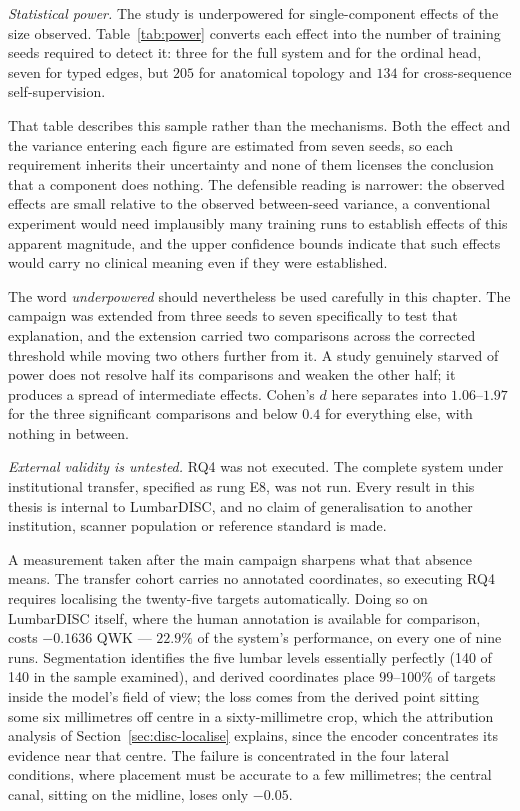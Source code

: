 \documentclass[12pt,a4paper]{report}
\begin{document}
\emph{Statistical power.} The study is underpowered for single-component effects
of the size observed. Table~\ref{tab:power} converts each effect into the number
of training seeds required to detect it: three for the full system and for the
ordinal head, seven for typed edges, but $205$ for anatomical topology and $134$
for cross-sequence self-supervision.

That table describes this sample rather than the mechanisms. Both the effect and
the variance entering each figure are estimated from seven seeds, so each
requirement inherits their uncertainty and none of them licenses the conclusion
that a component does nothing. The defensible reading is narrower: the observed
effects are small relative to the observed between-seed variance, a conventional
experiment would need implausibly many training runs to establish effects of this
apparent magnitude, and the upper confidence bounds indicate that such effects
would carry no clinical meaning even if they were established.

The word \emph{underpowered} should nevertheless be used carefully in this
chapter. The campaign was extended from three seeds to seven specifically to
test that explanation, and the extension carried two comparisons across the
corrected threshold while moving two others further from it. A study genuinely
starved of power does not resolve half its comparisons and weaken the other
half; it produces a spread of intermediate effects. Cohen's $d$ here separates
into $1.06$--$1.97$ for the three significant comparisons and below $0.4$ for
everything else, with nothing in between.

\emph{External validity is untested.} RQ4 was not executed. The complete system
under institutional transfer, specified as rung E8, was not run. Every result in
this thesis is internal to LumbarDISC, and no claim of generalisation to another
institution, scanner population or reference standard is made.

A measurement taken after the main campaign sharpens what that absence means.
The transfer cohort carries no annotated coordinates, so executing RQ4 requires
localising the twenty-five targets automatically. Doing so on LumbarDISC itself,
where the human annotation is available for comparison, costs $-0.1636$ QWK ---
$22.9\%$ of the system's performance, on every one of nine runs. Segmentation
identifies the five lumbar levels essentially perfectly (140 of 140 in the
sample examined), and derived coordinates place $99$--$100\%$ of targets inside
the model's field of view; the loss comes from the derived point sitting some
six millimetres off centre in a sixty-millimetre crop, which the attribution
analysis of Section~\ref{sec:disc-localise} explains, since the encoder
concentrates its evidence near that centre. The failure is concentrated in the
four lateral conditions, where placement must be accurate to a few millimetres;
the central canal, sitting on the midline, loses only $-0.05$.
\end{document}
